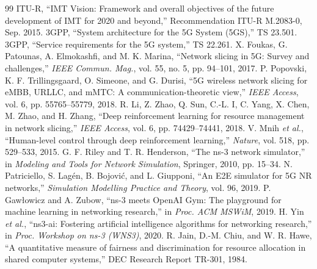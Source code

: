 \documentclass[conference]{IEEEtran}
\begin{document}
\begin{thebibliography}{99}
 ITU-R, ``IMT Vision: Framework and overall objectives of the future development of IMT for 2020 and beyond,'' Recommendation ITU-R M.2083-0, Sep. 2015.
 3GPP, ``System architecture for the 5G System (5GS),'' TS 23.501.
 3GPP, ``Service requirements for the 5G system,'' TS 22.261.
 X. Foukas, G. Patounas, A. Elmokashfi, and M. K. Marina, ``Network slicing in 5G: Survey and challenges,'' \emph{IEEE Commun. Mag.}, vol. 55, no. 5, pp. 94--101, 2017.
 P. Popovski, K. F. Trillingsgaard, O. Simeone, and G. Durisi, ``5G wireless network slicing for eMBB, URLLC, and mMTC: A communication-theoretic view,'' \emph{IEEE Access}, vol. 6, pp. 55765--55779, 2018.
 R. Li, Z. Zhao, Q. Sun, C.-L. I, C. Yang, X. Chen, M. Zhao, and H. Zhang, ``Deep reinforcement learning for resource management in network slicing,'' \emph{IEEE Access}, vol. 6, pp. 74429--74441, 2018.
 V. Mnih \emph{et al.}, ``Human-level control through deep reinforcement learning,'' \emph{Nature}, vol. 518, pp. 529--533, 2015.
 G. F. Riley and T. R. Henderson, ``The ns-3 network simulator,'' in \emph{Modeling and Tools for Network Simulation}, Springer, 2010, pp. 15--34.
 N. Patriciello, S. Lag\'en, B. Bojovi\'c, and L. Giupponi, ``An E2E simulator for 5G NR networks,'' \emph{Simulation Modelling Practice and Theory}, vol. 96, 2019.
 P. Gaw{\l}owicz and A. Zubow, ``ns-3 meets OpenAI Gym: The playground for machine learning in networking research,'' in \emph{Proc. ACM MSWiM}, 2019.
 H. Yin \emph{et al.}, ``ns3-ai: Fostering artificial intelligence algorithms for networking research,'' in \emph{Proc. Workshop on ns-3 (WNS3)}, 2020.
 R. Jain, D.-M. Chiu, and W. R. Hawe, ``A quantitative measure of fairness and discrimination for resource allocation in shared computer systems,'' DEC Research Report TR-301, 1984.
\end{thebibliography}
\end{document}
